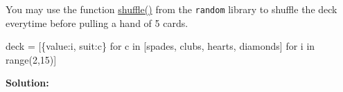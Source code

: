 \documentclass[
  letterpaper,
  DIV=11,
  numbers=noendperiod]{scrreprt}
\newenvironment{Shaded}{\begin{snugshade}}{\end{snugshade}}
\newcommand{\BuiltInTok}[1]{\textcolor[rgb]{0.00,0.23,0.31}{#1}}
\newcommand{\ControlFlowTok}[1]{\textcolor[rgb]{0.00,0.23,0.31}{#1}}
\newcommand{\DecValTok}[1]{\textcolor[rgb]{0.68,0.00,0.00}{#1}}
\newcommand{\KeywordTok}[1]{\textcolor[rgb]{0.00,0.23,0.31}{#1}}
\newcommand{\NormalTok}[1]{\textcolor[rgb]{0.00,0.23,0.31}{#1}}
\newcommand{\OperatorTok}[1]{\textcolor[rgb]{0.37,0.37,0.37}{#1}}
\newcommand{\StringTok}[1]{\textcolor[rgb]{0.13,0.47,0.30}{#1}}
\begin{document}
You may use the function
\href{https://docs.python.org/3/library/random.html}{shuffle()} from the
\texttt{random} library to shuffle the deck everytime before pulling a
hand of 5 cards.

\begin{Shaded}
\begin{Highlighting}[]
\NormalTok{deck }\OperatorTok{=}\NormalTok{ [\{}\StringTok{\textquotesingle{}value\textquotesingle{}}\NormalTok{:i, }\StringTok{\textquotesingle{}suit\textquotesingle{}}\NormalTok{:c\}}
\ControlFlowTok{for}\NormalTok{ c }\KeywordTok{in}\NormalTok{ [}\StringTok{\textquotesingle{}spades\textquotesingle{}}\NormalTok{, }\StringTok{\textquotesingle{}clubs\textquotesingle{}}\NormalTok{, }\StringTok{\textquotesingle{}hearts\textquotesingle{}}\NormalTok{, }\StringTok{\textquotesingle{}diamonds\textquotesingle{}}\NormalTok{]}
\ControlFlowTok{for}\NormalTok{ i }\KeywordTok{in} \BuiltInTok{range}\NormalTok{(}\DecValTok{2}\NormalTok{,}\DecValTok{15}\NormalTok{)]}
\end{Highlighting}
\end{Shaded}

\textbf{Solution:}
\end{document}
